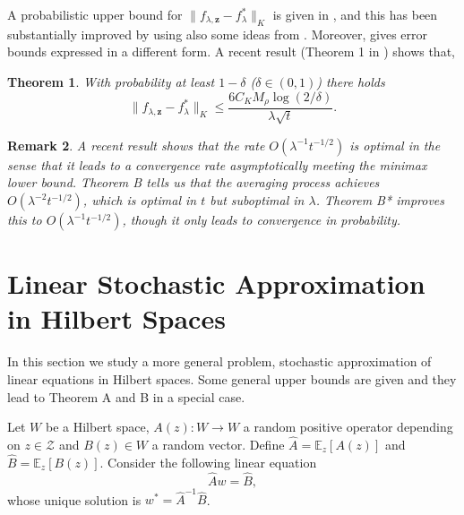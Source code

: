 \documentclass[twoside,twocolumn,journal]{IEEEtran}
\newtheorem{thm}{Theorem}[section]
\newtheorem{rem}[thm]{Remark}
\def\E{{\mathbb E}}        %
\def\ZZ{{\mathscr Z}}
\def\z{{\mathbf z}}
\begin{document}
A probabilistic upper bound for
$\|f_{\lambda,\z}-f^\ast_\lambda\|_K$ is given in
\cite{CucSma02b}, and this has been substantially improved by
\cite{DevCapRos04} using also some ideas from \cite{BouEli02}.
Moreover, \cite{Zhang03} gives error bounds expressed in a different form.
A recent result (Theorem 1 in \cite{SmaZho-ShannonIII}) shows that,

\medskip

\begin{thm} With probability at least $1-\delta$ ($\delta\in (0,1)$) there holds
\[ \| f_{\lambda,\z} - f^\ast_\lambda \|_K \leq \frac{6C_K M_\rho\log(2/\delta)}{\lambda \sqrt{t}}.\]
\end{thm}

\medskip

\begin{rem}
A recent result \cite{CapDev05} shows that the rate $O(\lambda^{-1} t^{-1/2})$ is optimal in the sense that it leads to a
convergence rate asymptotically meeting the minimax lower bound.
Theorem B tells us that the averaging process achieves $O(\lambda^{-2} t^{-1/2})$,
which is optimal in $t$ but suboptimal in $\lambda$. Theorem B* improves
this to $O(\lambda^{-1} t^{-1/2})$, though it only leads to convergence in probability. 
\end{rem}


\section{Linear Stochastic Approximation in Hilbert Spaces}


In this section we study a more general problem,
stochastic approximation of linear equations in Hilbert
spaces. Some general upper bounds
are given and they lead to Theorem A and B in a special case.

Let $W$ be a Hilbert space, $A(z):W\to W$ a random
positive operator depending on $z\in \ZZ$ and $B(z)\in W$ a random
vector. Define $\hat{A}=\E_z[A(z)]$ and $\hat{B}=\E_z[B(z)]$.
Consider the following linear equation
\begin{equation} \label{eq:basiclin}
\hat{A}w = \hat{B},
\end{equation}
whose unique solution is $w^\ast= \hat{A}^{-1} \hat{B}$.
\end{document}
